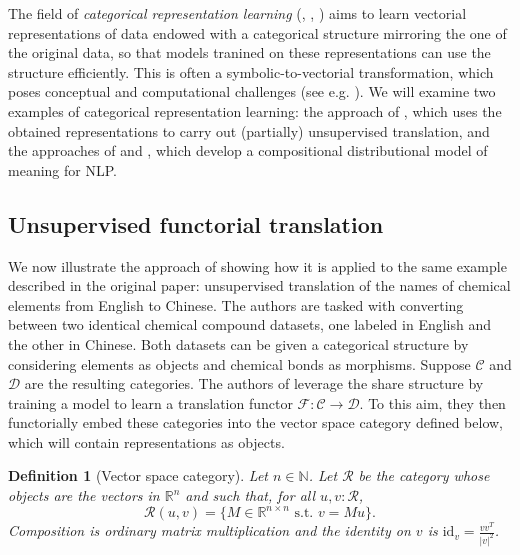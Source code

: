 \documentclass[11pt,a4paper,openright,twoside]{report}
\newcounter{mycounter}
\theoremstyle{plain}
\newtheorem{definition}[mycounter]{Definition}
\theoremstyle{definition}
\begin{document}
The field of \textit{categorical representation learning} (\cite{coecke2010mathematical}, \cite{lewis2019compositionality}, \cite{sheshmani2021categorical}) aims to learn vectorial representations of data endowed with a categorical structure mirroring the one of the original data, so that models tranined on these representations can use the structure efficiently. This is often a symbolic-to-vectorial transformation, which poses conceptual and computational challenges (see e.g. \cite{coecke2010mathematical}). We will examine two examples of categorical representation learning: the approach of \cite{sheshmani2021categorical}, which uses the obtained representations to carry out (partially) unsupervised translation, and the approaches of \cite{coecke2010mathematical} and \cite{lewis2019compositionality}, which develop a compositional distributional model of meaning for NLP.




\subsection{Unsupervised functorial translation}


We now illustrate the approach of \cite{sheshmani2021categorical} showing how it is applied to the same example described in the original paper: unsupervised translation of the names of chemical elements from English to Chinese. The authors are tasked with converting between two identical chemical compound datasets, one labeled in English and the other in Chinese. Both datasets can be given a categorical structure by considering elements as objects and chemical bonds as morphisms. Suppose $\mathcal{C}$ and $\mathcal{D}$ are the resulting categories. The authors of \cite{sheshmani2021categorical} leverage the share structure by training a model to learn a translation functor $\mathcal{F}: \mathcal{C} \to \mathcal{D}$. To this aim, they then functorially embed these categories into the vector space category defined below, which will contain representations as objects.


\begin{definition}[Vector space category]
  \label{def: vecspacecat}
  Let $n \in \mathbb{N}$. Let $\mathcal{R}$ be the category whose objects are the vectors in $\mathbb{R}^n$ and such that, for all $u,v :\mathcal{R}$, 
  \[\mathcal{R}(u, v) = \{M \in \mathbb{R}^{n \times n} \text{ s.t. } v = Mu\}.\]
  Composition is ordinary matrix multiplication and the identity on $v$ is $\mathrm{id}_v = \frac{vv^T}{|v|^2}$.
\end{definition}
\end{document}
